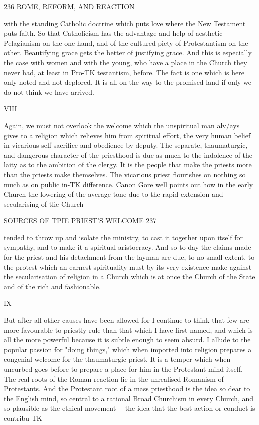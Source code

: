 \documentclass[12pt,a5paper,oneside]{book}
\begin{document}
{236 ROME, REFORM, AND REACTION 

with the standing Catholic doctrine which puts love 
where the New Testament puts faith. So that 
Catholicism has the advantage and help of aesthetic 
Pelagianism on the one hand, and of the cultured piety 
of Protestantism on the other. Beautifying grace gets 
the better of justifying grace. And this is especially 
the case with women and with the young, who have 
a place in the Church they never had, at least in Pro-TK
testantism, before. The fact is one which is here 
only noted and not deplored. It is all on the way to 
the promised land if only we do not think we have 
arrived. 

VIII 

Again, we must not overlook the welcome which 
the unspiritual man alv/ays gives to a religion which 
relieves him from spiritual effort, the very human 
belief in vicarious self-sacrifice and obedience by 
deputy. The separate, thaumaturgic, and dangerous 
character of the priesthood is due as much to the 
indolence of the laity as to the ambition of the 
clergy. It is the people that make the priests more 
than the priests make themselves. The vicarious 
priest flourishes on nothing so much as on public in-TK
difference. Canon Gore well points out how in the 
early Church the lowering of the average tone due to 
the rapid extension and secularising of tlie Church 



SOURCES OF TPIE PRIEST'S WELCOME 237 

tended to throw up and isolate the ministry, to cast it 
together upon itself for sympathy, and to make it a 
spiritual aristocracy. And so to-day the claims made 
for the priest and his detachment from the layman are 
due, to no small extent, to the protest which an earnest 
spirituality must by its very existence make against 
the secularisation of religion in a Church which is at 
once the Church of the State and of the rich and 
fashionable. 

IX 

But after all other causes have been allowed for I 
continue to think that few are more favourable to 
priestly rule than that which I have first named, and 
which is all the more powerful because it is subtle 
enough to seem absurd. I allude to the popular 
passion for "doing things," which when imported 
into religion prepares a congenial welcome for the 
thaumaturgic priest. It is a temper which when 
uncurbed goes before to prepare a place for him in 
the Protestant mind itself. The real roots of the 
Roman reaction lie in the unrealised Romanism of 
Protestants. And the Protestant root of a mass 
priesthood is the idea so dear to the English mind, 
so central to a rational Broad Churchism in every 
Church, and so plausible as the ethical movement---
the idea that the best action or conduct is contribu-TK



}
\end{document}
